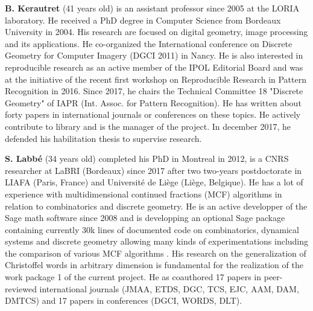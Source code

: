   
 \textbf{B. Kerautret} (41 years old) is an assistant professor since 2005
 at the LORIA laboratory. He received a PhD degree in Computer
 Science from Bordeaux University in 2004.  His research are
 focused on digital geometry, image processing and its applications.
 He co-organized the International conference on Discrete
 Geometry for Computer Imagery (DGCI 2011) in Nancy. He
 is also interested in reproducible research as an active member of the
 IPOL Editorial Board and was at the initiative of the recent
 first workshop on Reproducible Research in Pattern Recognition in
 2016.
 Since 2017, he chairs the Technical Committee 18 "Discrete Geometry" of IAPR
 (Int. Assoc. for Pattern Recognition). He has written
 about forty papers in international journals or conferences on these
 topics. He actively contribute to {\DGtal} library and is the manager of
 the {\DGtalTools} project.
 In december 2017, he defended his habilitation thesis to supervise research.
 

\textbf{S. Labb\'{e}} (34 years old) completed his PhD in Montreal in 2012, is
a CNRS researcher at LaBRI (Bordeaux) since 2017 after two two-years
postdoctorate in LIAFA (Paris, France) and Université de Liège (Liège,
Belgique).  He has a lot of experience with multidimensional continued
fractions (MCF) algorithms \cite{arnoux_labbe_2017,cassaigne_a_set_2017} in
relation to combinatorics and discrete geometry.  He is an active developper of
the Sage math software since 2008 and is developping an optional Sage package
containing currently 30k lines of documented code \cite{labbe_slabbe_0_4_2018}
on combinatorics, dynamical systems and discrete geometry allowing many kinds
of experimentations including the comparison of various MCF algorithms
\cite{labbe_3-dimensional_2015}.  His research on the generalization of
Christoffel words in arbitrary dimension \cite{Labbe2015} is fundamental for
the realization of the work package 1 of the current project.  He as coauthored
17 papers in peer-reviewed international journals (\eg JMAA, ETDS, DGC, TCS,
EJC, AAM, DAM, DMTCS) and 17 papers in conferences (\eg DGCI, WORDS, DLT).

